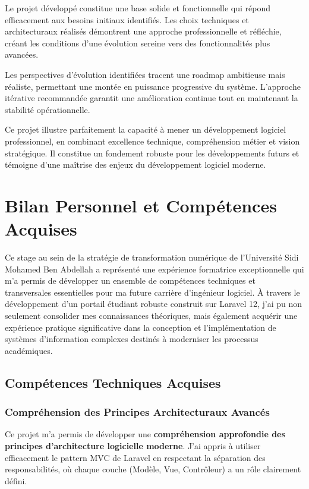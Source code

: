\documentclass[12pt,a4paper]{report}
\begin{document}
Le projet développé constitue une base solide et fonctionnelle qui répond efficacement aux besoins initiaux identifiés. Les choix techniques et architecturaux réalisés démontrent une approche professionnelle et réfléchie, créant les conditions d'une évolution sereine vers des fonctionnalités plus avancées.

Les perspectives d'évolution identifiées tracent une roadmap ambitieuse mais réaliste, permettant une montée en puissance progressive du système. L'approche itérative recommandée garantit une amélioration continue tout en maintenant la stabilité opérationnelle.

Ce projet illustre parfaitement la capacité à mener un développement logiciel professionnel, en combinant excellence technique, compréhension métier et vision stratégique. Il constitue un fondement robuste pour les développements futurs et témoigne d'une maîtrise des enjeux du développement logiciel moderne.


\chapter{Bilan Personnel et Compétences Acquises}

Ce stage au sein de la stratégie de transformation numérique de l'Université Sidi Mohamed Ben Abdellah a représenté une expérience formatrice exceptionnelle qui m'a permis de développer un ensemble de compétences techniques et transversales essentielles pour ma future carrière d'ingénieur logiciel. À travers le développement d'un portail étudiant robuste construit sur Laravel 12, j'ai pu non seulement consolider mes connaissances théoriques, mais également acquérir une expérience pratique significative dans la conception et l'implémentation de systèmes d'information complexes destinés à moderniser les processus académiques.

\section{Compétences Techniques Acquises}


\subsection{Compréhension des Principes Architecturaux Avancés}

Ce projet m'a permis de développer une \textbf{compréhension approfondie des principes d'architecture logicielle moderne}. J'ai appris à utiliser efficacement le pattern MVC de Laravel en respectant la séparation des responsabilités, où chaque couche (Modèle, Vue, Contrôleur) a un rôle clairement défini.
\end{document}
